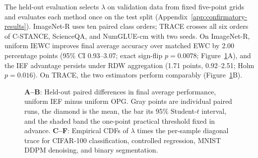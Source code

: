 The held-out evaluation selects $\lambda$ on validation data from fixed five-point grids and evaluates each method once on the test split (Appendix~\ref{app:confirmatory-results}). ImageNet-R uses ten paired class orders; TRACE crosses all six orders of C-STANCE, ScienceQA, and NumGLUE-cm with two seeds. On ImageNet-R, uniform IEWC improves final average accuracy over matched EWC by 2.00 percentage points (95\% CI 0.93--3.07; exact sign-flip $p=0.0078$; Figure~\ref{fig:locked-summands}A), and the IEF advantage persists under RDW aggregation (1.71 points, 0.92--2.51; Holm $p=0.016$). On TRACE, the two estimators perform comparably (Figure~\ref{fig:locked-summands}B).

\begin{figure}[t]
\centering


\vspace{2mm}

\caption[Held-out paired effects and effective summand norms]{\textbf{A--B}: Held-out paired differences in final average performance, uniform IEF minus uniform OPG. Gray points are individual paired runs, the diamond is the mean, the bar its 95\% Student-$t$ interval, and the shaded band the one-point practical threshold fixed in advance. \textbf{C--F}: Empirical CDFs of $\lambda$ times the per-sample diagonal trace for CIFAR-100 classification, controlled regression, MNIST DDPM denoising, and binary segmentation.}
\label{fig:locked-summands}
\end{figure}
